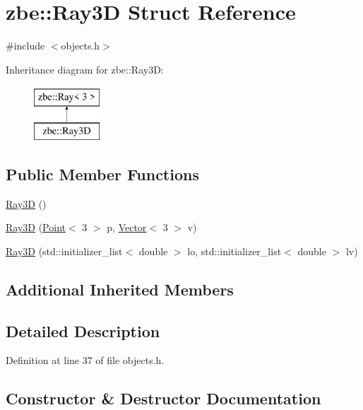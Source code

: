\hypertarget{structzbe_1_1_ray3_d}{}\section{zbe\+:\+:Ray3\+D Struct Reference}
\label{structzbe_1_1_ray3_d}


{\ttfamily \#include $<$objects.\+h$>$}

Inheritance diagram for zbe\+:\+:Ray3\+D\+:\begin{figure}[H]
\begin{center}
\leavevmode
\includegraphics[height=2.000000cm]{structzbe_1_1_ray3_d}
\end{center}
\end{figure}
\subsection*{Public Member Functions}
\begin{DoxyCompactItemize}
\item 
\hyperlink{structzbe_1_1_ray3_d_aeacc9820d43cfcb0e421b16feeb8b7d0}{Ray3\+D} ()
\item 
\hyperlink{structzbe_1_1_ray3_d_a858eefb9eb400c570bed0b552c2ad633}{Ray3\+D} (\hyperlink{classzbe_1_1_point}{Point}$<$ 3 $>$ p, \hyperlink{classzbe_1_1_vector}{Vector}$<$ 3 $>$ v)
\item 
\hyperlink{structzbe_1_1_ray3_d_aed4225011d659fe8a913a940ace94833}{Ray3\+D} (std\+::initializer\+\_\+list$<$ double $>$ lo, std\+::initializer\+\_\+list$<$ double $>$ lv)
\end{DoxyCompactItemize}
\subsection*{Additional Inherited Members}


\subsection{Detailed Description}


Definition at line 37 of file objects.\+h.



\subsection{Constructor \& Destructor Documentation}
\hypertarget{structzbe_1_1_ray3_d_aeacc9820d43cfcb0e421b16feeb8b7d0}{}
